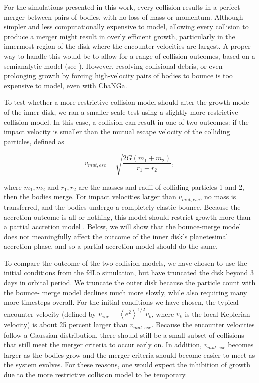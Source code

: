 \documentclass[twocolumn]{aastex63}
\begin{document}
For the simulations presented in this work, every collision results in a perfect merger between pairs of bodies, with no loss
of mass or momentum. Although simpler and less computationally expensive to model, allowing every collision to produce a
merger might result in overly efficient growth, particularly in the innermost region of the disk where the encounter velocities are 
largest. A proper way to handle this would be to allow for a range of collision outcomes, based on a semianalytic model (see 
\citet{leinhardt12}). However, resolving collisional debris, or even prolonging growth by forcing high-velocity pairs of bodies to 
bounce is too expensive to model, even with {\sc ChaNGa}.

To test whether a more restrictive collision model should alter the growth mode of the inner disk, we ran a smaller scale test 
using a slightly more restrictive collision model. In this case, a collision can result in one of two outcomes: if the impact velocity is 
smaller than the mutual escape velocity of the colliding particles, defined as

\begin{equation}\label{eq:v_mut}
	v_{mut, esc} = \sqrt{\frac{2 G (m_{1} + m_{2})}{r_{1} + r_{2}}},
\end{equation}

where $m_{1}, m_{2}$ and $r_{1}, r_{2}$ are the masses and radii of
colliding particles 1 and 2, then the bodies merge. For
impact velocities larger than $v_{mut, esc}$, no mass is transferred, and the bodies undergo a completely elastic bounce. 
Because the accretion outcome is all or nothing, this model should restrict growth more than a partial accretion model 
\citep{leinhardt12}. Below, we will show that the bounce-merge model does not meaningfully affect the outcome of the inner 
disk's planetesimal accretion phase, and so a partial accretion model should do the same.

To compare the outcome of the two collision models, we have chosen to use the initial conditions from the fdLo simulation, but 
have truncated the disk beyond 3 days in orbital period. We truncate the outer disk because the particle count with the bounce-
merge model declines much more slowly, while also requiring many more timesteps overall.
For the initial conditions we have chosen, the typical encounter velocity (defined by $v_{enc} = \left< e^{2} \right>^{1/2} v_{k}$, 
where $v_{k}$ is the local Keplerian velocity) is about 25 percent larger than $v_{mut, esc}$. Because the encounter velocities 
follow a Gaussian distribution, there should still be a small subset of collisions that still meet the merger criteria to occur early on. 
In addition, $v_{mut, esc}$ becomes larger as the bodies grow and the merger criteria should become easier to meet as the 
system evolves. For these reasons, one would expect the inhibition of growth due to the more restrictive collision model to be 
temporary.
\end{document}
